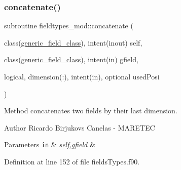 \subsubsection{\texorpdfstring{concatenate()}{concatenate()}}
{\footnotesize\ttfamily subroutine fieldtypes\+\_\+mod\+::concatenate (\begin{DoxyParamCaption}\item[{class(\mbox{\hyperlink{structfieldtypes__mod_1_1generic__field__class}{generic\+\_\+field\+\_\+class}}), intent(inout)}]{self,  }\item[{class(\mbox{\hyperlink{structfieldtypes__mod_1_1generic__field__class}{generic\+\_\+field\+\_\+class}}), intent(in)}]{gfield,  }\item[{logical, dimension(\+:), intent(in), optional}]{used\+Posi }\end{DoxyParamCaption})\hspace{0.3cm}{\ttfamily [private]}}



Method concatenates two fields by their last dimension. 

\begin{DoxyAuthor}{Author}
Ricardo Birjukovs Canelas -\/ M\+A\+R\+E\+T\+EC 
\end{DoxyAuthor}

\begin{DoxyParams}[1]{Parameters}
\mbox{\tt in}  & {\em self,gfield} & \\
\hline
\end{DoxyParams}


Definition at line 152 of file fields\+Types.\+f90.


